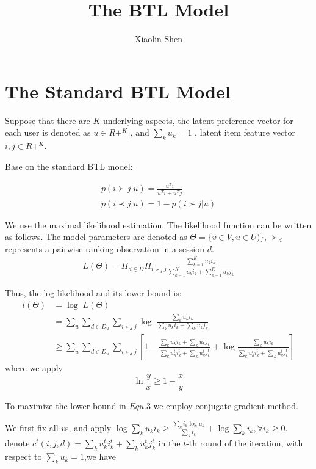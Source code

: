 \documentclass{article}
\title{The BTL Model}
\author{Xiaolin Shen}
\begin{document}
\maketitle


\section{The Standard BTL Model}

Suppose that there are $K$ underlying aspects, the latent preference vector for each user is denoted as $ u \in  R+ ^K$ , and $\sum_k u_k = 1$ , latent item feature vector $ i, j \in R + ^K$.

Base on the standard BTL model:

\begin{align*}
	p(i \succ j |u)=\frac{u^{T}i}{u^{T}i+ u^{T}j} \\
	p(i \prec j |u)=1-p(i \succ j |u)
\end{align*}

We use the maximal likelihood estimation. The likelihood function can be written as follows. The model parameters are denoted as $ \Theta = \{ v \in V ,u \in U ) \}$, $\succ_d $ represents a pairwise ranking observation in a session $d$.
\begin{align}
L(\Theta)
= \Pi_{d \in D} \Pi_{i \succ_d j}\frac{\sum_{k=1}^{K} u_k i_k}{\sum_{k=1}^{K} u_k i_k+ \sum_{k=1}^{K} u_k j_k}
\end{align}

Thus, the log likelihood and its lower bound is:
\begin{align}
l(\Theta) &= \log \; L(\Theta) \\
& =\sum_{u} \sum_{d\in D_u} \sum_{i \succ_d j} \log \;  \frac{\sum_k u_k i_k}{\sum_k u_k i_k+ \sum_k u_k j_k}\\ \nonumber
& \geq \sum_{u} \sum_{d\in D_u} \sum_{i \succ_d j}[1- \frac{\sum_k u_k i_k+ \sum_k u_k j_k}{\sum_k u_k^t i_k^t+ \sum_k u_k^t j_k^t}+ \log \frac{\sum_k u_k i_k}{\sum_k u_k^t i_k^t+ \sum_k u_k^t j_k^t}]
\end{align}
where we apply 
\begin{equation*}
\ln \frac{y}{x} \geq 1- \frac{x}{y}
\end{equation*}

To maximize the lower-bound in $Equ.3$ we employ conjugate gradient method. 

We first fix all $v$s, and apply  $ \log \sum_k u_k i_k \geq \frac{\sum_k i_k \log u_k}{\sum_k i_k} + \log \sum_k i_k,\forall i_k \geq 0.$  denote $ c^t(i, j, d)=\sum_k u_k^t i_k^t+ \sum_k u_k^t j_k^t  $ in the $t$-th round of the iteration, with respect to $\sum_k u_k=1$,we have
\end{document}
